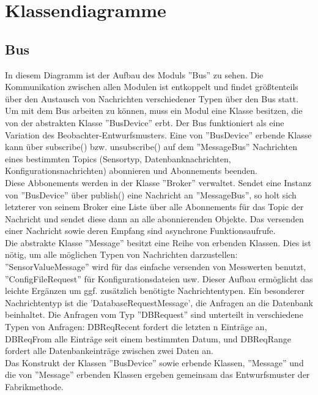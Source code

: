 \documentclass[entwurf.tex]{subfiles}
\begin{document}
\chapter{Klassendiagramme}
	\section{Bus}
		
  		In diesem Diagramm ist der Aufbau des Moduls ''Bus'' zu sehen. Die Kommunikation zwischen allen Modulen ist entkoppelt und findet größtenteils über den Austausch von Nachrichten verschiedener Typen über den Bus statt. Um mit dem Bus arbeiten zu können, muss ein Modul eine Klasse besitzen, die von der abstrakten Klasse ''BusDevice'' erbt. Der Bus funktioniert als eine Variation des Beobachter-Entwurfsmusters. Eine von ''BusDevice'' erbende Klasse kann über subscribe() bzw. unsubscribe() auf dem ''MessageBus'' Nachrichten eines bestimmten Topics (Sensortyp, Datenbanknachrichten, Konfigurationsnachrichten) abonnieren und Abonnements beenden. \\
  		Diese Abbonements werden in der Klasse ''Broker'' verwaltet. Sendet eine Instanz von ''BusDevice'' über publish() eine Nachricht an ''MessageBus'', so holt sich letzterer von seinem Broker eine Liste über alle Abonnements für das Topic der Nachricht und sendet diese dann an alle abonnierenden Objekte. Das versenden einer Nachricht sowie deren Empfang sind asynchrone Funktionsaufrufe. \\
  		Die abstrakte Klasse ''Message'' besitzt eine Reihe von erbenden Klassen. Dies ist nötig, um alle möglichen Typen von Nachrichten darzustellen: ''SensorValueMessage'' wird für das einfache versenden von Messwerten benutzt, ''ConfigFileRequest'' für Konfigurationsdateien usw. Dieser Aufbau ermöglicht das leichte Ergänzen um ggf. zusätzlich benötigte Nachrichtentypen. Ein besonderer Nachrichtentyp ist die 'DatabaseRequestMessage', die Anfragen an die Datenbank beinhaltet. Die Anfragen vom Typ ''DBRequest'' sind unterteilt in verschiedene Typen von Anfragen: DBReqRecent fordert die letzten n Einträge an, DBReqFrom alle Einträge seit einem bestimmten Datum, und DBReqRange fordert alle Datenbankeinträge zwischen zwei Daten an. \\
  		Das Konstrukt der Klassen ''BusDevice'' sowie erbende Klassen, ''Message'' und die von ''Message'' erbenden Klassen ergeben gemeinsam das Entwurfsmuster der Fabrikmethode.
  		
\end{document}
